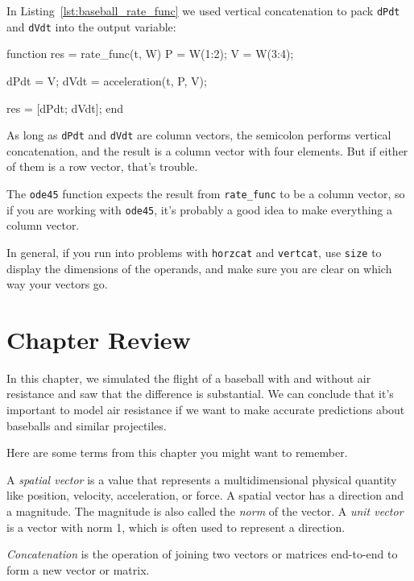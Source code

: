 
In Listing~\ref{lst:baseball_rate_func} we used vertical concatenation to pack \lstinline{dPdt} and \lstinline{dVdt} into the output variable:

\begin{code}
function res = rate_func(t, W)
    P = W(1:2);
    V = W(3:4);

    dPdt = V;
    dVdt = acceleration(t, P, V);

    res = [dPdt; dVdt];
end
\end{code}

As long as \lstinline{dPdt} and \lstinline{dVdt} are column vectors,
the semicolon performs vertical concatenation, and the result is
a column vector with four elements.  But if either of them is a
row vector, that's trouble.


The \lstinline{ode45} function expects the result from \lstinline{rate_func} to be a
column vector, so if you are working with \lstinline{ode45}, it's
probably a good idea to make everything a column vector.

In general, if you run into problems with \lstinline{horzcat} and
\lstinline{vertcat}, use \lstinline{size} to display the dimensions of the operands,
and make sure you are clear on which way your vectors go.

\section{Chapter Review}

In this chapter, we simulated the flight of a baseball with and without air resistance and saw that the difference is substantial.
We can conclude that it's important to model air resistance if we want to make accurate predictions about baseballs and similar projectiles.

Here are some terms from this chapter you might want to remember.

A \emph{spatial vector} is a value that represents a multidimensional physical quantity like position, velocity, acceleration, or force.
A spatial vector has a direction and a magnitude.  The magnitude is also called the \emph{norm} of the vector.
A \emph{unit vector} is a vector with norm 1, which is often used to represent a
direction.

\emph{Concatenation} is the operation of joining two vectors or matrices end-to-end to
form a new vector or matrix.

